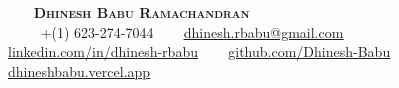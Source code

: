 \begin{center}
    \textbf{\Huge \scshape Dhinesh Babu Ramachandran} \\ \vspace{1pt}
     \ \small +(1) 623-274-7044 \quad
    \href{mailto:dhinesh.rbabu@gmail.com}{ \underline{dhinesh.rbabu@gmail.com}} \quad
    \href{https://www.linkedin.com/in/dhinesh-rbabu}{ \underline{linkedin.com/in/dhinesh-rbabu}} \quad \newline
    \href{https://github.com/Dhinesh-Babu}{ \underline{github.com/Dhinesh-Babu}} \quad
    \href{https://dhineshbabu.vercel.app}{ \underline{dhineshbabu.vercel.app}}
\end{center}